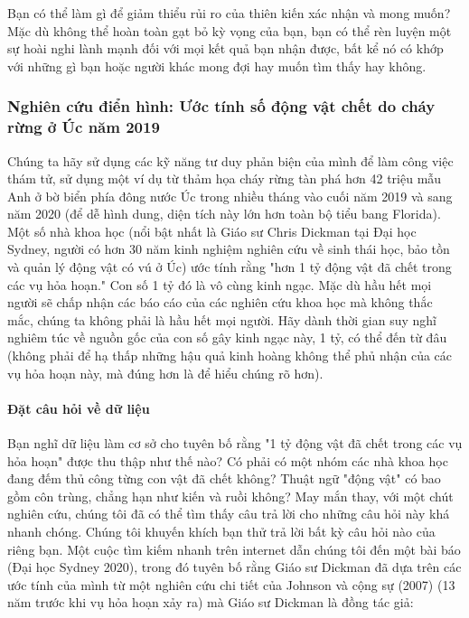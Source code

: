 Bạn có thể làm gì để giảm thiểu rủi ro của thiên kiến xác nhận và mong muốn? Mặc dù không thể hoàn toàn gạt bỏ kỳ vọng của bạn, bạn có thể rèn luyện một sự hoài nghi lành mạnh đối với mọi kết quả bạn nhận được, bất kể nó có khớp với những gì bạn hoặc người khác mong đợi hay muốn tìm thấy hay không.

\subsubsection{Nghiên cứu điển hình: Ước tính số động vật chết do cháy rừng ở Úc năm 2019}
Chúng ta hãy sử dụng các kỹ năng tư duy phản biện của mình để làm công việc thám tử, sử dụng một ví dụ từ thảm họa cháy rừng tàn phá hơn 42 triệu mẫu Anh ở bờ biển phía đông nước Úc trong nhiều tháng vào cuối năm 2019 và sang năm 2020 (để dễ hình dung, diện tích này lớn hơn toàn bộ tiểu bang Florida). Một số nhà khoa học (nổi bật nhất là Giáo sư Chris Dickman tại Đại học Sydney, người có hơn 30 năm kinh nghiệm nghiên cứu về sinh thái học, bảo tồn và quản lý động vật có vú ở Úc) ước tính rằng "hơn 1 tỷ động vật đã chết trong các vụ hỏa hoạn." Con số 1 tỷ đó là vô cùng kinh ngạc. Mặc dù hầu hết mọi người sẽ chấp nhận các báo cáo của các nghiên cứu khoa học mà không thắc mắc, chúng ta không phải là hầu hết mọi người. Hãy dành thời gian suy nghĩ nghiêm túc về nguồn gốc của con số gây kinh ngạc này, 1 tỷ, có thể đến từ đâu (không phải để hạ thấp những hậu quả kinh hoàng không thể phủ nhận của các vụ hỏa hoạn này, mà đúng hơn là để hiểu chúng rõ hơn).

\paragraph{Đặt câu hỏi về dữ liệu}

Bạn nghĩ dữ liệu làm cơ sở cho tuyên bố rằng "1 tỷ động vật đã chết trong các vụ hỏa hoạn" được thu thập như thế nào? Có phải có một nhóm các nhà khoa học đang đếm thủ công từng con vật đã chết không? Thuật ngữ "động vật" có bao gồm côn trùng, chẳng hạn như kiến và ruồi không? May mắn thay, với một chút nghiên cứu, chúng tôi đã có thể tìm thấy câu trả lời cho những câu hỏi này khá nhanh chóng. Chúng tôi khuyến khích bạn thử trả lời bất kỳ câu hỏi nào của riêng bạn. Một cuộc tìm kiếm nhanh trên internet dẫn chúng tôi đến một bài báo (Đại học Sydney 2020), trong đó tuyên bố rằng Giáo sư Dickman đã dựa trên các ước tính của mình từ một nghiên cứu chi tiết của Johnson và cộng sự (2007) (13 năm trước khi vụ hỏa hoạn xảy ra) mà Giáo sư Dickman là đồng tác giả:

